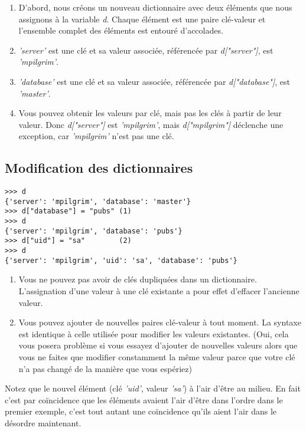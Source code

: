 \begin{enumerate}
\item{D'abord, nous créons un nouveau dictionnaire avec deux éléments que nous assignons à la variable \emph{d}. Chaque élément est une paire clé-valeur et l'ensemble complet des éléments est entouré d'accolades.}
\item{\emph{'server'} est une clé et sa valeur associée, référencée par \emph{d["server"]}, est \emph{'mpilgrim'}.}
\item{\emph{'database'} est une clé et sa valeur associée, référencée par \emph{d["database"]}, est \emph{'master'}.}
\item{Vous pouvez obtenir les valeurs par clé, mais pas les clés à partir de leur valeur. Donc \emph{d["server"]} est \emph{'mpilgrim'}, mais \emph{d["mpilgrim"]} déclenche une exception, car \emph{'mpilgrim'} n'est pas une clé.}
\end{enumerate}

\subsection{Modification des dictionnaires}

\begin{example}
\begin{lstlisting}
>>> d
{'server': 'mpilgrim', 'database': 'master'}
>>> d["database"] = "pubs" (1)
>>> d
{'server': 'mpilgrim', 'database': 'pubs'}
>>> d["uid"] = "sa"        (2)
>>> d
{'server': 'mpilgrim', 'uid': 'sa', 'database': 'pubs'}
\end{lstlisting}
\end{example}

\begin{enumerate}
\item{Vous ne pouvez pas avoir de clés dupliquées dans un dictionnaire. L'assignation d'une valeur à une clé existante a pour effet d'effacer l'ancienne valeur.}
\item{Vous pouvez ajouter de nouvelles paires clé-valeur à tout moment. La syntaxe est identique à celle utilisée pour modifier les valeurs existantes. (Oui, cela vous posera problème si vous essayez d'ajouter de nouvelles valeurs alors que vous ne faites que modifier constamment la même valeur parce que votre clé n'a pas changé de la manière que vous espériez)}
\end{enumerate}

Notez que le nouvel élément (clé \emph{'uid'}, valeur \emph{'sa'}) à l'air d'être au milieu. En fait c'est par coïncidence que les éléments avaient l'air d'être dans l'ordre dans le premier exemple, c'est tout autant une coïncidence qu'ils aient l'air dans le désordre maintenant.

